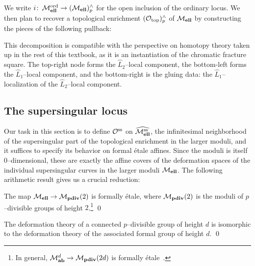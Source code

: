 \noindent We write \(i\colon\thinspace \mathcal{M}_{\mathbf{ell}}^{\mathrm{ord}} \to (\mathcal{M}_{\mathbf{ell}})^\wedge_p\) for the open inclusion of the ordinary locus.  We then plan to recover a topological enrichment $(\mathcal{O}_{\mathrm{top}})^\wedge_p$ of $\mathcal{M}_{\mathbf{ell}}$ by constructing the pieces of the following pullback:
\begin{center}
\end{center}
This decomposition is compatible with the perspective on homotopy theory taken up in the rest of this textbook, as it is an instantiation of the chromatic fracture square.  The top-right node forms the \(\widehat L_2\)--local component, the bottom-left forms the \(\widehat L_1\)--local component, and the bottom-right is the gluing data: the \(\widehat L_1\)--localization of the \(\widehat L_2\)--local component.






\subsection*{The supersingular locus}

Our task in this section is to define \(\mathcal{O}^{\mathrm{ss}}\) on \(\widehat{\mathcal{M}_{\mathbf{ell}}^{\mathrm{ss}}}\), the infinitesimal neighborhood of the supersingular part of the topological enrichment in the larger moduli, and it suffices to specify its behavior on formal \'etale affines.  Since the moduli is itself \(0\)--dimensional, these are exactly the affine covers of the deformation spaces of the individual supersingular curves in the larger moduli \(\mathcal{M}_{\mathbf{ell}}\).  The following arithmetic result gives us a crucial reduction:

\begin{theorem}
The map \(\mathcal{M}_{\mathbf{ell}} \to \mathcal{M}_{\mathbf{pdiv}}(2)\) is formally \'etale, where \(\mathcal{M}_{\mathbf{pdiv}}(2)\) is the moduli of \(p\)--divisible groups of height \(2\).\footnote{In general, \(\mathcal{M}_{\mathbf{ab}}^{d} \to \mathcal{M}_{\mathbf{pdiv}}(2d)\) is formally \'etale~\cite[Appendix 1]{KatzSTLocalModuli}.} \qed
\end{theorem}
\begin{lemma}
The deformation theory of a connected \(p\)--divisible group of height \(d\) is isomorphic to the deformation theory of the associated formal group of height \(d\). \qed
\end{lemma}

